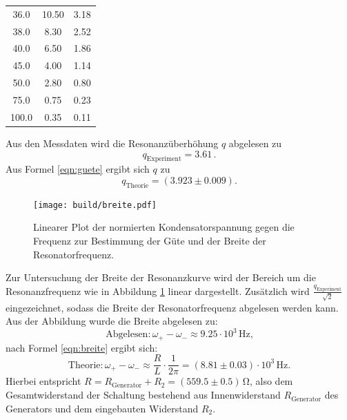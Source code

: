 \begin{table}
\begin{tabular}{ccc}
		36.0                        & 10.50                     & 3.18                      \\
		38.0                        & 8.30                      & 2.52                      \\
		40.0                        & 6.50                      & 1.86                      \\
		45.0                        & 4.00                      & 1.14                      \\
		50.0                        & 2.80                      & 0.80                      \\
		75.0                        & 0.75                      & 0.23                      \\
		100.0                       & 0.35                      & 0.11                      \\
		\bottomrule
	\end{tabular}
\end{table}

Aus den Messdaten wird die Resonanzüberhöhung $q$ abgelesen zu
\begin{equation*}
	q_\mathrm{Experiment}= 3.61 \, .
\end{equation*}
Aus Formel \eqref{eqn:guete} ergibt sich $q$ zu
\begin{equation*}
	q_\mathrm{Theorie}= (3.923 \pm 0.009) .
\end{equation*}

\begin{figure}
	\texttt{[image: build/breite.pdf]}
	\caption{Linearer Plot der normierten Kondensatorspannung gegen die Frequenz zur Bestimmung der Güte und der Breite der Resonatorfrequenz.}
	\label{fig:breite}
\end{figure}
Zur Untersuchung der Breite der Resonanzkurve wird der Bereich um die Resonanzfrequenz
wie in Abbildung \ref{fig:breite} linear dargestellt.
Zusätzlich wird $\frac{q_\mathrm{Experiment}}{\sqrt{2}}$ eingezeichnet, sodass die Breite der Resonatorfrequenz abgelesen werden kann.
Aus der Abbildung wurde die Breite abgelesen zu:
\begin{equation*}
	\text{Abgelesen}: \omega_+ - \omega_- \approx 9.25 \cdot 10^{3} \,\si{\Hz} \text{,}
\end{equation*}
nach Formel \eqref{eqn:breite} ergibt sich:
\begin{equation*}
	\text{Theorie}: 	\omega_+ - \omega_- \approx \frac{R}{L}\cdot \frac{1}{2\pi}=(8.81\pm 0.03) \cdot 10^{3} \,\si{\Hz} \text{.}
\end{equation*}
Hierbei entspricht $R=R_{\mathrm{Generator}}+R_2=(559.5 \pm 0.5)\,\si{\ohm}$, also dem Gesamtwiderstand der Schaltung bestehend aus Innenwiderstand $R_{\mathrm{Generator}}$ des Generators und dem eingebauten Widerstand $R_2$.

